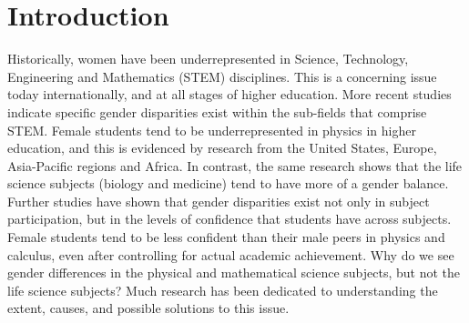 \section{Introduction}
Historically, women have been underrepresented in Science, Technology, Engineering and Mathematics (STEM) disciplines. This is a concerning issue today internationally, and at all stages of higher education.\cite{Abraham_2014,Stevanovic_2013,Smith_2011} More recent studies indicate specific gender disparities exist within the sub-fields that comprise STEM.\cite{mullis2016timss} Female students tend to be underrepresented in physics in higher education, and this is evidenced by research from the United States\cite{NSF, Cunningham_2015,Kost_Smith_2010,Heilbronner_2012}, Europe\cite{Huyer2007, Stevanovic_2013, InstituteofPhysics_2012, InstituteofPhysics_2013, Smith_2011}, Asia-Pacific regions\cite{EducationCounts_2016a, Kennedy_2014} and Africa.\cite{Semela_2010} In contrast, the same research shows that the life science subjects (biology and medicine) tend to have more of a gender balance. Further studies have shown that gender disparities exist not only in subject participation, but in the levels of confidence that students have across subjects. Female students tend to be less confident than their male peers in physics\cite{kelly2016social, Hofer_2016} and calculus\cite{Ellis_2016}, even after controlling for actual academic achievement.\cite{marshman2018female} Why do we see gender differences in the physical and mathematical science subjects, but not the life science subjects? Much research has been dedicated to understanding the extent, causes, and possible solutions to this issue.\cite{cheryan2017some,Brewe_2016, Blickenstaff_2005}

